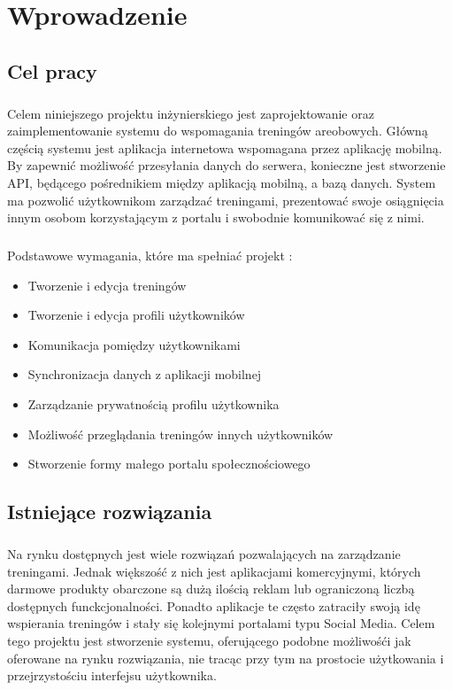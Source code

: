 \chapter{Wprowadzenie}

\section{Cel pracy}
\label{sec:cel_pracy}
\paragraph{}
Celem niniejszego projektu inżynierskiego jest zaprojektowanie oraz zaimplementowanie systemu do wspomagania treningów areobowych. Główną częścią systemu jest aplikacja internetowa wspomagana przez aplikację mobilną. By zapewnić możliwość przesyłania danych do serwera, konieczne jest stworzenie API, będącego pośrednikiem między aplikacją mobilną, a bazą danych.
System ma pozwolić użytkownikom zarządzać treningami, prezentować swoje osiągnięcia innym osobom korzystającym z portalu i swobodnie komunikować się z nimi.
\paragraph{} %
\label{par:}
Podstawowe wymagania, które ma spełniać projekt :
\begin{itemize}
	\item Tworzenie i edycja treningów
	\item Tworzenie i edycja profili użytkowników
	\item Komunikacja pomiędzy użytkownikami
	\item Synchronizacja danych z aplikacji mobilnej
	\item Zarządzanie prywatnością profilu użytkownika
	\item Możliwość przeglądania treningów innych użytkowników
	\item Stworzenie formy małego portalu społecznościowego
\end{itemize}

\section{Istniejące rozwiązania}
\paragraph{}
Na rynku dostępnych jest wiele rozwiązań pozwalających na zarządzanie treningami. Jednak większość z nich jest aplikacjami komercyjnymi, których darmowe produkty obarczone są dużą ilością reklam lub ograniczoną liczbą dostępnych funckcjonalności. Ponadto aplikacje te często zatraciły swoją idę wspierania treningów i stały się kolejnymi portalami typu Social Media. Celem tego projektu jest stworzenie systemu, oferującego podobne możliwośći jak oferowane na rynku rozwiązania, nie tracąc przy tym na prostocie użytkowania i przejrzystościu interfejsu użytkownika.
